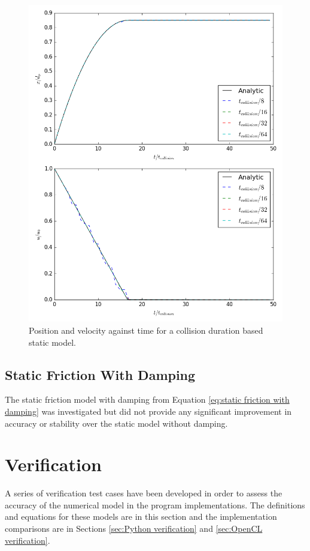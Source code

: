 \documentclass[a4paper,11pt,titlepage]{report}
\begin{document}
\begin{figure}[!ht]
\centering
\includegraphics[scale=0.5]{figures/friction_model/t_col_static.png}
\caption{Position and velocity against time for a collision duration based static model.}
\label{fig:t_col_static}
\end{figure}
\subsection{Static Friction With Damping}
The static friction model with damping from Equation \ref{eq:static friction with damping} was investigated but did not provide any significant improvement in accuracy or stability over the static model without damping.
\section{Verification}
A series of verification test cases have been developed in order to assess the accuracy of the numerical model in the program implementations. The definitions and equations for these models are in this section and the implementation comparisons are in Sections \ref{sec:Python verification} and \ref{sec:OpenCL verification}.
\label{sec:verification}
\end{document}
